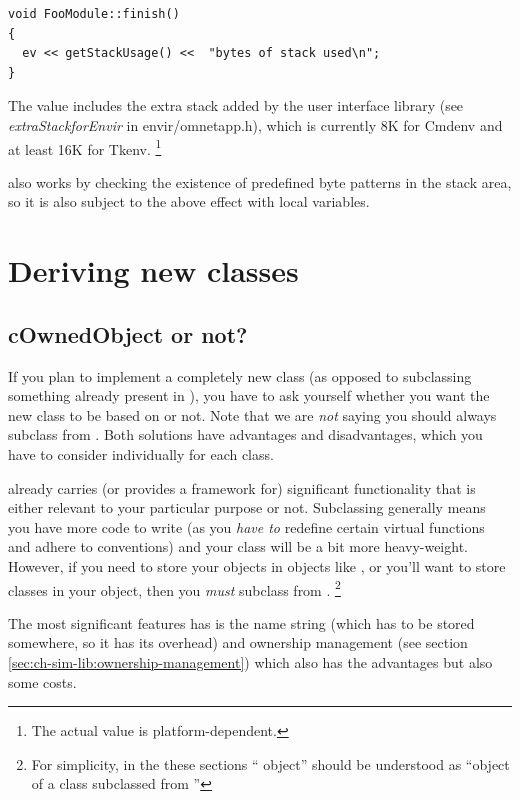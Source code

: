 \begin{verbatim}
void FooModule::finish()
{
  ev << getStackUsage() <<  "bytes of stack used\n";
}
\end{verbatim}


The value includes the extra stack added by the user interface library
(see \textit{extraStackforEnvir} in
envir/omnetapp.h), which is currently 8K for Cmdenv and at least 16K
for Tkenv.
  \footnote{The actual value is platform-dependent.}

also works by checking the existence of predefined
byte patterns in the stack area, so it is also subject to the above
effect with local variables.



\section{Deriving new classes}
\label{sec:ch-sim-lib:deriving-new-classes}

\subsection{cOwnedObject or not?}

If you plan to implement a completely new class (as opposed to
subclassing something already present in {\opp}), you have
to ask yourself whether you want the new class to be based
on  or not.
Note that we are \textit{not} saying you should always
subclass from .
Both solutions have advantages and disadvantages, which you
have to consider individually for each class.

 already carries (or provides a framework for)
significant functionality that is either relevant to
your particular purpose or not. Subclassing 
generally means you have more code to write (as you \textit{have to}
redefine certain virtual functions and adhere to conventions)
and your class will be a bit more heavy-weight.
However, if you need to store your objects in {\opp} objects like ,
or you'll want to store {\opp} classes in your object,
then you \textit{must} subclass from .
  \footnote{For simplicity, in the these sections ``{\opp} object''
  should be understood as ``object of a class subclassed from
  ''}

The most significant features  has is
the name string (which has to be stored somewhere, so it has
its overhead) and ownership management (see section
\ref{sec:ch-sim-lib:ownership-management}) which
also has the advantages but also some costs.


